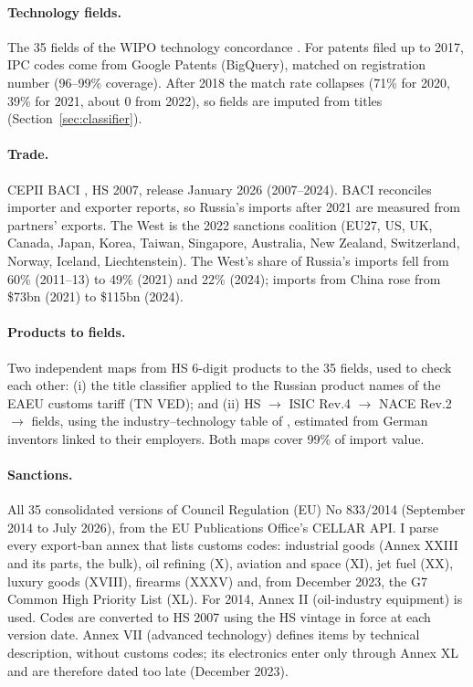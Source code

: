 \documentclass[11pt,a4paper]{article}
\begin{document}
\paragraph{Technology fields.} The 35 fields of the WIPO technology concordance \citep{Schmoch2008}. For patents
filed up to 2017, IPC codes come from Google Patents (BigQuery), matched on registration number (96--99\%
coverage). After 2018 the match rate collapses (71\% for 2020, 39\% for 2021, about 0 from 2022), so fields are
imputed from titles (Section~\ref{sec:classifier}).

\paragraph{Trade.} CEPII BACI \citep{GaulierZignago2010}, HS 2007, release January 2026 (2007--2024). BACI
reconciles importer and exporter reports, so Russia's imports after 2021 are measured from partners' exports. The
West is the 2022 sanctions coalition (EU27, US, UK, Canada, Japan, Korea, Taiwan, Singapore, Australia, New
Zealand, Switzerland, Norway, Iceland, Liechtenstein). The West's share of Russia's imports fell from 60\%
(2011--13) to 49\% (2021) and 22\% (2024); imports from China rose from \$73bn (2021) to \$115bn (2024).

\paragraph{Products to fields.} Two independent maps from HS 6-digit products to the 35 fields, used to check
each other:
(i) the title classifier applied to the Russian product names of the EAEU customs tariff (TN VED); and
(ii) HS $\to$ ISIC Rev.4 \citep[R package \texttt{concordance}]{concordance} $\to$ NACE Rev.2 $\to$ fields, using the
industry--technology table of \citet{DornerHarhoff2018}, estimated from German inventors linked to their
employers. Both maps cover 99\% of import value.

\paragraph{Sanctions.} All 35 consolidated versions of Council Regulation (EU) No 833/2014 (September 2014 to
July 2026), from the EU Publications Office's CELLAR API. I parse every export-ban annex that lists customs codes:
industrial goods (Annex XXIII and its parts, the bulk), oil refining (X), aviation and space (XI), jet fuel (XX),
luxury goods (XVIII), firearms (XXXV) and, from December 2023, the G7 Common High Priority List (XL). For 2014,
Annex II (oil-industry equipment) is used. Codes are converted to HS 2007 using the HS vintage in force at each
version date. Annex VII (advanced technology) defines items by technical description, without customs codes; its
electronics enter only through Annex XL and are therefore dated too late (December 2023).
\end{document}
